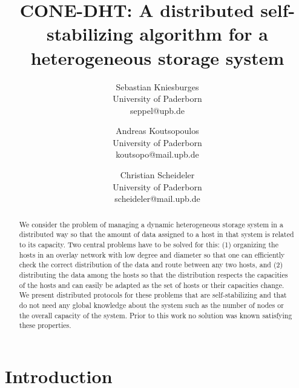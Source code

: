 \documentclass[11pt]{article}
\begin{document}
   

\date{}
\begin{titlepage}

\title{CONE-DHT: A distributed self-stabilizing algorithm for a heterogeneous storage system}

\author{Sebastian Kniesburges \\
   University of Paderborn \\
   seppel@upb.de \\
   \and
   Andreas Koutsopoulos \\
   University of Paderborn  \\
   koutsopo@mail.upb.de\\
   \and
   Christian Scheideler\\
   University of Paderborn  \\
   scheideler@mail.upb.de
   }

\maketitle \thispagestyle{empty}



\begin{abstract}
We consider the problem of managing a dynamic heterogeneous storage system in
a distributed way so that the amount of data assigned to a host in that system
is related to its capacity. Two central problems have to be solved for this:
(1) organizing the hosts in an overlay network with low degree and diameter so
that one can efficiently check the correct distribution of the data and route
between any two hosts, and (2) distributing the data among the hosts so that
the distribution respects the capacities of the hosts and can easily be
adapted as the set of hosts or their capacities change. We present distributed
protocols for these problems that are self-stabilizing and that do not need
any global knowledge about the system such as the number of nodes or the
overall capacity of the system. Prior to this work no solution was known
satisfying these properties.
\end{abstract}

\bigskip




\end{titlepage}


\section{Introduction}
\end{document}
